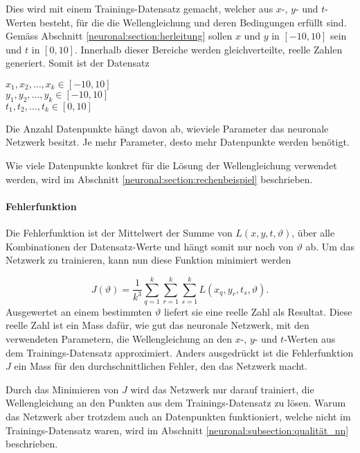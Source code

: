 Dies wird mit einem Trainings-Datensatz gemacht, welcher aus \( x \)-, \( y \)- und \( t \)-Werten besteht, für die die Wellengleichung und deren Bedingungen erfüllt sind.
Gemäss Abschnitt \ref{neuronal:section:herleitung} sollen \( x \) und \( y \) in \( [-10,10] \) sein und \( t \) in \( [0,10] \).
Innerhalb dieser Bereiche werden gleichverteilte, reelle Zahlen generiert.
Somit ist der Datensatz
\begin{center}
    \( x_1, x_2, \ldots, x_k \in [-10,10] \)\\
    \( y_1, y_2, \ldots, y_k \in [-10,10] \)\\
    \( t_1, t_2, \ldots, t_k \in [0,10] \)\\
\end{center}

Die Anzahl Datenpunkte hängt davon ab, wieviele Parameter das neuronale Netzwerk besitzt.
Je mehr Parameter, desto mehr Datenpunkte werden benötigt.

Wie viele Datenpunkte konkret für die Lösung der Wellengleichung verwendet werden, wird im Abschnitt \ref{neuronal:section:rechenbeispiel} beschrieben.

\paragraph{Fehlerfunktion}

Die Fehlerfunktion ist der Mittelwert der Summe von \( L(x, y, t, \vartheta) \), über alle Kombinationen der Datensatz-Werte und hängt somit nur noch von \( \vartheta \) ab.
Um das Netzwerk zu trainieren, kann nun diese Funktion minimiert werden

\begin{equation}
    J(\vartheta) = \frac{1}{k^3} \sum_{q=1}^{k} \sum_{r=1}^{k} \sum_{s=1}^{k} L(x_q, y_r, t_s, \vartheta).
    \label{neuronal:loss}
\end{equation}
Ausgewertet an einem bestimmten \( \vartheta \) liefert sie eine reelle Zahl als Resultat.
Diese reelle Zahl ist ein Mass dafür, wie gut das neuronale Netzwerk, mit den verwendeten Parametern, die Wellengleichung an den \( x \)-, \( y \)- und \( t \)-Werten aus dem Trainings-Datensatz approximiert.
Anders ausgedrückt ist die Fehlerfunktion \( J \) ein Mass für den durchschnittlichen Fehler, den das Netzwerk macht.

Durch das Minimieren von \( J \) wird das Netzwerk nur darauf trainiert, die Wellengleichung an den Punkten aus dem Trainings-Datensatz zu lösen.
Warum das Netzwerk aber trotzdem auch an Datenpunkten funktioniert, welche nicht im Trainings-Datensatz waren, wird im Abschnitt \ref{neuronal:subsection:qualität_nn} beschrieben.

